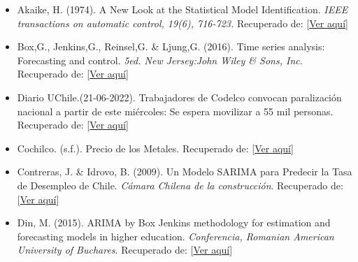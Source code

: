 \documentclass{report}
\begin{document}
\begin{itemize}
 
\item Akaike, H. (1974). A New Look at the Statistical Model Identification. \textit{IEEE transactions on automatic control, 19(6), 716-723.} Recuperado de:
[\textcolor{blue}{\href{http://bayes.acs.unt.edu:8083/BayesContent/class/Jon/MiscDocs/Akaike_1974.pdf}{Ver aquí}}]\\
\vspace{0.3cm}

\item Box,G., Jenkins,G., Reinsel,G. \& Ljung,G. (2016). Time series analysis: Forecasting and control.
\textit{5ed. New Jersey:John Wiley \& Sons, Inc}. Recuperado de:
[\textcolor{blue}{\href{http://www.ru.ac.bd/stat/wp-content/uploads/sites/25/2019/03/504_05_Box_Time-Series-Analysis-Forecasting-and-Control-2015.pdf}{Ver aquí}}]\\
\vspace{0.3cm}

\item Diario UChile.(21-06-2022). Trabajadores de Codelco convocan paralización nacional a partir de este miércoles: Se espera movilizar a 55 mil personas. Recuperado de: [\textcolor{blue}{\href{https://radio.uchile.cl/2022/06/21/trabajadores-de-codelco-convocan-paralizacion-nacional-a-partir-de-este-miercoles-se-espera-movilizar-a-55-mil-personas/}{Ver aquí}}]\\
\vspace{0.3cm}

\item Cochilco. (s.f.). Precio de los Metales. Recuperado de:
[\textcolor{blue}{\href{https://www.cochilco.cl/Paginas/Estadisticas/Bases\%20de\%20Datos/Precio-de-los-Metales.aspx}{Ver aquí}}]\\
\vspace{0.3cm}

\item Contreras, J. \& Idrovo, B. (2009). Un Modelo SARIMA para Predecir la Tasa de Desempleo de Chile. \textit{Cámara Chilena de la construcción}. Recuperado de:
[\textcolor{blue}{\href{https://extension.cchc.cl/datafiles/21804.pdf}{Ver aquí}}]\\
\vspace{0.3cm}

\item Din, M. (2015). ARIMA by Box Jenkins methodology for estimation and forecasting models in higher education. \textit{Conferencia, Romanian American University of Buchares}. Recuperado de:
[\textcolor{blue}{\href{https://www.researchgate.net/publication/298972010_ARIMA_by_Box_Jenkins_Methodology_for_Estimation_and_Forecasting_Models_in_Higher_Education}{Ver aquí}}]
\vspace{0.3cm}


\end{itemize}
\end{document}
